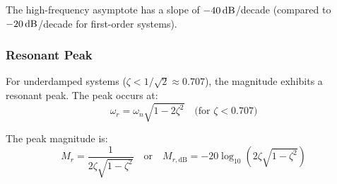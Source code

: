 The high-frequency asymptote has a slope of $-40\,\text{dB}$/decade (compared to $-20\,\text{dB}$/decade for first-order systems).

\subsubsection{Resonant Peak}

For underdamped systems ($\zeta < 1/\sqrt{2} \approx 0.707$), the magnitude exhibits a resonant peak. The peak occurs at:
\begin{equation}
\omega_r = \omega_n\sqrt{1 - 2\zeta^2} \quad \text{(for } \zeta < 0.707\text{)}
\label{eq:resonant_freq}
\end{equation}

The peak magnitude is:
\begin{equation}
M_r = \frac{1}{2\zeta\sqrt{1 - \zeta^2}} \quad \text{or} \quad M_{r,\text{dB}} = -20\log_{10}(2\zeta\sqrt{1-\zeta^2})
\label{eq:resonant_peak}
\end{equation}


